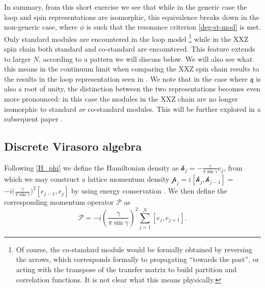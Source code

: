 \documentclass[a4paper,10pt]{article}
\newcommand{\q}{\mathfrak{q}}
\newcommand{\linnea}[1]{$\framebox{\tiny L}$\ \textbf{\texttt{{\color{red}\footnotesize#1}}}}
\newcommand{\jesper}[1]{$\framebox{\tiny J}$\ \textbf{\texttt{{\color{cyan}\footnotesize#1}}}}
\newcommand{\PN}{\mathcal{P}}
\begin{document}
In summary, from this short exercise we see that while in the generic case the loop and spin representations are isomorphic, this equivalence  breaks down in the  non-generic case, where $\phi$ is such that the resonance criterion \eqref{deg-st-mod} is met. 
Only standard modules are encountered in the loop model \footnote{Of course, the co-standard module would be formally obtained by reversing the arrows, which corresponds formally to propagating ``towards the past'', or acting with the  transpose of the  transfer matrix to build partition and correlation functions. It is not clear what this means physically.} while in the XXZ spin chain both standard and co-standard are encountered. This feature extends to larger $N$, according to a pattern we will discuss below. We will also see what this means in the continuum limit when comparing the XXZ spin chain results to the results in the loop representation seen in \cite{LoopPaper}. We note that in the case where $\q$ is also a root of unity, the distinction between the two representations becomes even more pronounced: in this case the modules in the XXZ chain are no longer isomorphic to standard \emph{or} co-standard modules. This will be further explored in a subsequent paper \cite{fullynongenericpaper}.





\subsection{Discrete Virasoro algebra}\label{Discrete_Vir_Section}




Following \eqref{H_phi} we define the Hamiltonian density as %
${\mathcal h}_j=-\frac{\gamma}{\pi\sin\gamma}e_j$, from which we may construct a lattice momentum density ${\mathcal p}_j = i[{\mathcal h}_j,\mathcal{h}_{j-1}]=$ \phantom{ }%
 $ -i \big(\frac{\gamma}{\pi\sin\gamma} \big)^2 [e_{j-1},e_j]$ by using energy conservation \cite{Vidal}. We then define the corresponding momentum operator $\PN$ as 
\begin{equation}\label{P_phi}
\PN = -i \left( \frac{\gamma}{ \pi \sin \gamma} \right)^2  \sum^{N}_{j=1} [e_j, e_{j+1} ].
\end{equation}
\end{document}
